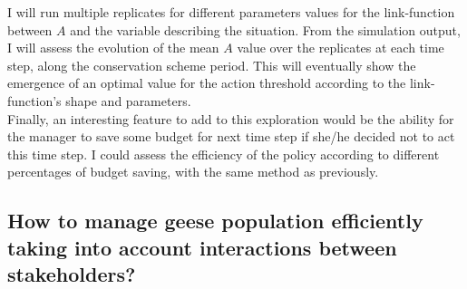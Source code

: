 \documentclass[12pt,a4paper]{article}
\begin{document}
I will run multiple replicates for different parameters values for the link-function between $A$ and the variable describing the situation.
From the simulation output, I will assess the evolution of the mean $A$ value over the replicates at each time step, along the conservation scheme period.
This will eventually show the emergence of an optimal value for the action threshold according to the link-function's shape and parameters.\\

Finally, an interesting feature to add to this exploration would be the ability for the manager to save some budget for next time step if she/he decided not to act this time step.
I could assess the efficiency of the policy according to different percentages of budget saving, with the same method as previously.


%
%

\subsection{How to manage geese population efficiently taking into account interactions between stakeholders?}
\end{document}
